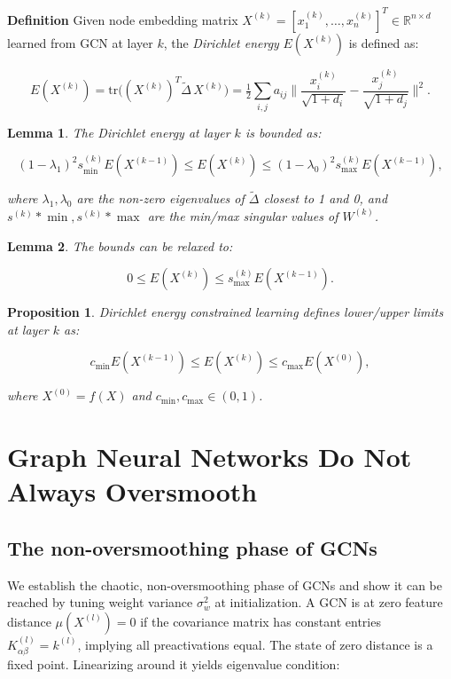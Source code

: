 \documentclass[11pt]{article}\usepackage{amsmath,amssymb,amsthm,bbm}
\newtheorem{lemma}{Lemma}
\newtheorem{proposition}{Proposition}
\newcommand{\1}{\mathbbm{1}}
\begin{document}
\textbf{Definition}
Given node embedding matrix $X^{(k)} = [x^{(k)}_1,\dots,x^{(k)}_n]^T\in\mathbb{R}^{n\times d}$ learned from GCN at layer $k$, the \emph{Dirichlet energy} $E(X^{(k)})$ is defined as:

$$
E(X^{(k)}) = \mathrm{tr}\bigl((X^{(k)})^T \tilde \Delta\,X^{(k)}\bigr) = \tfrac12 \sum_{i,j} a_{ij} \biggl\|\frac{x^{(k)}_i}{\sqrt{1+d_i}} - \frac{x^{(k)}_j}{\sqrt{1+d_j}}\biggr\|^2.
$$



\begin{lemma}
The Dirichlet energy at layer $k$ is bounded as:

$$
(1-\lambda_1)^2 s^{(k)}_{\min} E(X^{(k-1)}) \le E(X^{(k)}) \le (1-\lambda_0)^2 s^{(k)}_{\max} E(X^{(k-1)}),
$$

where $\lambda_1,\lambda_0$ are the non-zero eigenvalues of $\tilde \Delta$ closest to 1 and 0, and $s^{(k)}*{\min},s^{(k)}*{\max}$ are the min/max singular values of $W^{(k)}$.
\end{lemma}

\begin{lemma}
The bounds can be relaxed to:

$$
0 \le E(X^{(k)}) \le s^{(k)}_{\max} E(X^{(k-1)}).
$$

\end{lemma}

\begin{proposition}
Dirichlet energy constrained learning defines lower/upper limits at layer $k$ as:

$$
c_{\min} E(X^{(k-1)}) \le E(X^{(k)}) \le c_{\max} E(X^{(0)}),
$$

where $X^{(0)} = f(X)$ and $c_{\min},c_{\max}\in(0,1)$.
\end{proposition}

\section*{Graph Neural Networks Do Not Always Oversmooth}
\subsection*{The non-oversmoothing phase of GCNs}
We establish the chaotic, non-oversmoothing phase of GCNs and show it can be reached by tuning weight variance $\sigma_w^2$ at initialization. A GCN is at zero feature distance $\mu(X^{(l)})=0$ if the covariance matrix has constant entries $K^{(l)}_{\alpha\beta}=k^{(l)}$, implying all preactivations equal. The state of zero distance is a fixed point. Linearizing around it yields eigenvalue condition:
\end{document}
